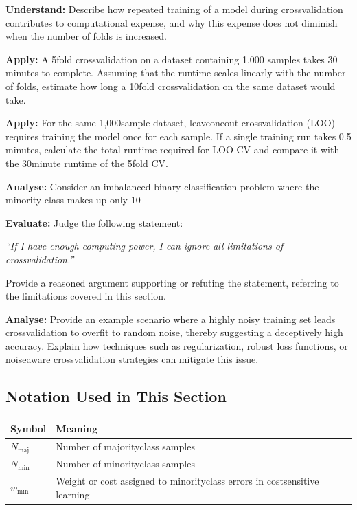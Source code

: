 \documentclass[12pt, a4paper]{article}
\begin{document}
\newpage
\textbf{Understand:}  
Describe how repeated training of a model during crossvalidation contributes to computational expense, and why this expense does not diminish when the number of folds is increased.

\newpage
\textbf{Apply:}  
A 5fold crossvalidation on a dataset containing 1,000 samples takes 30 minutes to complete. Assuming that the runtime scales linearly with the number of folds, estimate how long a 10fold crossvalidation on the same dataset would take.

\newpage
\textbf{Apply:}  
For the same 1,000sample dataset, leaveoneout crossvalidation (LOO) requires training the model once for each sample.  
If a single training run takes 0.5 minutes, calculate the total runtime required for LOO CV and compare it with the 30minute runtime of the 5fold CV.

\newpage
\textbf{Analyse:}  
Consider an imbalanced binary classification problem where the minority class makes up only 10 %

\newpage
\textbf{Evaluate:}  
Judge the following statement:  

\emph{``If I have enough computing power, I can ignore all limitations of crossvalidation.''}  

Provide a reasoned argument supporting or refuting the statement, referring to the limitations covered in this section.

\newpage
\textbf{Analyse:}  
Provide an example scenario where a highly noisy training set leads crossvalidation to overfit to random noise, thereby suggesting a deceptively high accuracy. Explain how techniques such as regularization, robust loss functions, or noiseaware crossvalidation strategies can mitigate this issue.

\newpage

\subsection*{Notation Used in This Section}
\begin{tabular}{@{}ll@{}}
\toprule
Symbol & Meaning \\ \midrule
    $N_{\text{maj}}$ & Number of majorityclass samples \\
    $N_{\text{min}}$ & Number of minorityclass samples \\
    $w_{\text{min}}$ & Weight or cost assigned to minorityclass errors in costsensitive learning \\
\bottomrule
\end{tabular}
\vspace{1em}
\end{document}
